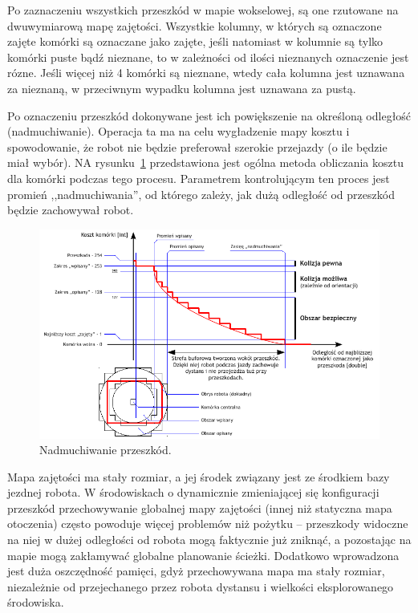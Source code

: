 Po zaznaczeniu wszystkich przeszkód w mapie wokselowej, są one rzutowane na
dwuwymiarową mapę zajętości. Wszystkie kolumny, w których są oznaczone zajęte
komórki są oznaczane jako zajęte, jeśli natomiast w kolumnie są tylko komórki
puste bądź nieznane, to w zależności od ilości nieznanych oznaczenie jest rózne.
Jeśli więcej niż 4 komórki są nieznane, wtedy cała kolumna jest uznawana za
nieznaną, w przeciwnym wypadku kolumna jest uznawana za pustą.

Po oznaczeniu przeszkód dokonywane jest ich powiększenie na określoną odległość
(nadmuchiwanie). Operacja ta ma na celu wygładzenie mapy kosztu i spowodowanie,
że robot nie będzie preferował szerokie przejazdy (o ile będzie miał wybór). NA
rysunku~\ref{fig:inflation} przedstawiona jest ogólna metoda obliczania kosztu
dla komórki podczas tego procesu. Parametrem kontrolującym ten proces jest
promień ,,nadmuchiwania'', od którego zależy, jak dużą odległość od
przeszkód będzie zachowywał robot.

\begin{figure}[htb!]
\centering
\includegraphics[width=15cm]{../../Common/img/ros/inflate.pdf}
\caption{Nadmuchiwanie przeszkód.}
\label{fig:inflation}
\end{figure}

Mapa zajętości ma stały rozmiar, a jej środek związany jest ze środkiem bazy
jezdnej robota. W środowiskach o dynamicznie zmieniającej się konfiguracji
przeszkód przechowywanie globalnej mapy zajętości (innej niż statyczna mapa
otoczenia) często powoduje więcej problemów niż pożytku -- przeszkody widoczne
na niej w dużej odległości od robota mogą faktycznie już zniknąć, a pozostając
na mapie mogą zakłamywać globalne planowanie ścieżki. Dodatkowo wprowadzona jest
duża oszczędność pamięci, gdyż przechowywana mapa ma stały rozmiar, niezależnie
od przejechanego przez robota dystansu i wielkości eksplorowanego środowiska.

